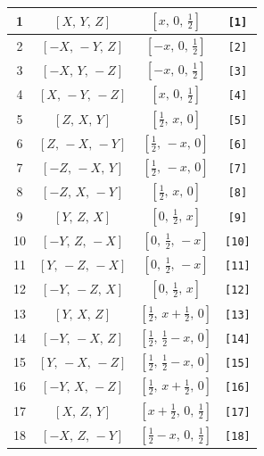 \documentclass[fleqn,8pt]{jsarticle}
\begin{document}
\begin{longtable}{cccc}
1 & $\left[ X,\, Y,\, Z \right]$ & $\left[ x,\, 0,\, \frac{1}{2} \right]$ & {\tt [1]} \\ \hline
2 & $\left[ - X,\, - Y,\, Z \right]$ & $\left[ - x,\, 0,\, \frac{1}{2} \right]$ & {\tt [2]} \\ \hline
3 & $\left[ - X,\, Y,\, - Z \right]$ & $\left[ - x,\, 0,\, \frac{1}{2} \right]$ & {\tt [3]} \\ \hline
4 & $\left[ X,\, - Y,\, - Z \right]$ & $\left[ x,\, 0,\, \frac{1}{2} \right]$ & {\tt [4]} \\ \hline
5 & $\left[ Z,\, X,\, Y \right]$ & $\left[ \frac{1}{2},\, x,\, 0 \right]$ & {\tt [5]} \\ \hline
6 & $\left[ Z,\, - X,\, - Y \right]$ & $\left[ \frac{1}{2},\, - x,\, 0 \right]$ & {\tt [6]} \\ \hline
7 & $\left[ - Z,\, - X,\, Y \right]$ & $\left[ \frac{1}{2},\, - x,\, 0 \right]$ & {\tt [7]} \\ \hline
8 & $\left[ - Z,\, X,\, - Y \right]$ & $\left[ \frac{1}{2},\, x,\, 0 \right]$ & {\tt [8]} \\ \hline
9 & $\left[ Y,\, Z,\, X \right]$ & $\left[ 0,\, \frac{1}{2},\, x \right]$ & {\tt [9]} \\ \hline
10 & $\left[ - Y,\, Z,\, - X \right]$ & $\left[ 0,\, \frac{1}{2},\, - x \right]$ & {\tt [10]} \\ \hline
11 & $\left[ Y,\, - Z,\, - X \right]$ & $\left[ 0,\, \frac{1}{2},\, - x \right]$ & {\tt [11]} \\ \hline
12 & $\left[ - Y,\, - Z,\, X \right]$ & $\left[ 0,\, \frac{1}{2},\, x \right]$ & {\tt [12]} \\ \hline
13 & $\left[ Y,\, X,\, Z \right]$ & $\left[ \frac{1}{2},\, x + \frac{1}{2},\, 0 \right]$ & {\tt [13]} \\ \hline
14 & $\left[ - Y,\, - X,\, Z \right]$ & $\left[ \frac{1}{2},\, \frac{1}{2} - x,\, 0 \right]$ & {\tt [14]} \\ \hline
15 & $\left[ Y,\, - X,\, - Z \right]$ & $\left[ \frac{1}{2},\, \frac{1}{2} - x,\, 0 \right]$ & {\tt [15]} \\ \hline
16 & $\left[ - Y,\, X,\, - Z \right]$ & $\left[ \frac{1}{2},\, x + \frac{1}{2},\, 0 \right]$ & {\tt [16]} \\ \hline
17 & $\left[ X,\, Z,\, Y \right]$ & $\left[ x + \frac{1}{2},\, 0,\, \frac{1}{2} \right]$ & {\tt [17]} \\ \hline
18 & $\left[ - X,\, Z,\, - Y \right]$ & $\left[ \frac{1}{2} - x,\, 0,\, \frac{1}{2} \right]$ & {\tt [18]} \\ \hline

\end{longtable}
\end{document}
